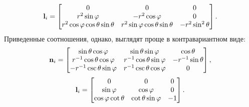 \documentclass[12pt,a4paper]{article}
\begin{document}
            \begin{equation}
                \mathbf{l}_i
                =
                \begin{bmatrix}
                    0
                        & 0
                        & 0 \\
                    r^2 \sin\varphi
                        & - r^2 \cos\varphi
                        & 0 \\
                    r^2 \cos\varphi \cos\theta \sin\theta
                        & r^2 \sin\varphi \cos\theta \sin\theta
                        & - r^2 \sin^2\theta
                \end{bmatrix}
                .
            \end{equation}
            Приведенные соотношения, однако, выглядят проще в контравариантном виде:
            \begin{equation}
                \mathbf{n}_i
                =
                \begin{bmatrix}
                    \sin\theta \cos\varphi          & \sin\theta \sin\varphi        & \cos\theta \\
                    r^{-1} \cos\theta \cos\varphi   & r^{-1} \cos\theta \sin\varphi & - r^{-1} \sin\theta \\
                    - r^{-1} \csc\theta \sin\varphi & r^{-1} \csc\theta \cos\varphi & 0
                \end{bmatrix}
                ,
            \end{equation}
            \begin{equation}
                \mathbf{l}_i
                =
                \begin{bmatrix}
                    0
                        & 0
                        & 0 \\
                    \sin\varphi
                        & \cos\varphi
                        & 0 \\
                    \cos\varphi \cot\theta
                        & \cot\theta \sin\varphi
                        & - 1
                \end{bmatrix}
                .
            \end{equation}

\end{document}
